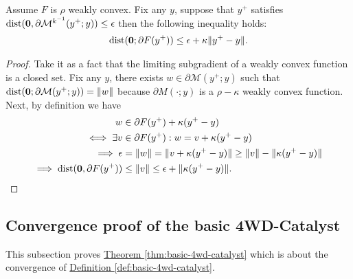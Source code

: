 \documentclass[12pt]{article}
\begin{document}
    \begin{lemma}\label{app:lemma:ncnvx-catalyst-stationary-cond}
        Assume $F$ is $\rho$ weakly convex. 
        Fix any $y$, suppose that $y^+$ satisfies $\operatorname{dist}(\mathbf 0,\partial \mathcal M^{k^{-1}}(y^+; y)) \le \epsilon$ then the following inequality holds: 
        \begin{align*}
            \operatorname{dist}(\mathbf 0; \partial F(y^+)) 
            \le \epsilon + \kappa\Vert y^+ - y\Vert. 
        \end{align*}
    \end{lemma}
    \begin{proof}
        Take it as a fact that the limiting subgradient of a weakly convex function is a closed set. 
        Fix any $y$, there exists $w \in \partial \mathcal M(y^+; y)$ such that $\operatorname{dist}(\mathbf 0; \partial {\mathcal M}(y^+; y)) = \Vert w\Vert$ because $\partial M(\cdot;y)$ is a $\rho - \kappa$ weakly convex function. 
        Next, by definition we have
        \begin{align*}
            w &\in \partial F(y^+) + \kappa(y^+ - y)
            \\
            \iff 
            \exists v &
            \in \partial  F(y^+): 
            w = v + \kappa(y^+ - y)
            \\
            \implies 
            \epsilon &= 
            \Vert w\Vert = \Vert v + \kappa(y^+ - y)\Vert 
            \ge \Vert v\Vert - \Vert \kappa(y^+ - y)\Vert
            \\
            \implies 
            \operatorname{dist}(\mathbf 0, \partial F(y^+)) &\le 
            \Vert v\Vert 
            \le \epsilon + \Vert \kappa(y^+ - y)\Vert. 
        \end{align*}

    \end{proof}

    \subsection{Convergence proof of the basic 4WD-Catalyst}
        This subsection proves 
        \hyperref[thm:basic-4wd-catalyst]{Theorem \ref*{thm:basic-4wd-catalyst}}
        which is about the convergence of 
        \hyperref[def:basic-4wd-catalyst]{Definition \ref*{def:basic-4wd-catalyst}}. 
        
\end{document}

